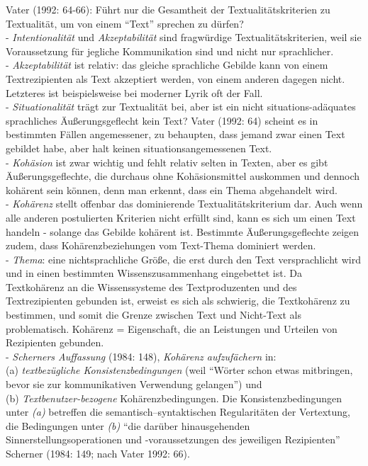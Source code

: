 \documentclass[
  letterpaper,
]{scrbook}
\begin{document}
Vater (1992: 64-66): Führt nur die Gesamtheit der Textualitätskriterien
zu Textualität, um von einem ``Text'' sprechen zu dürfen?\\
- \emph{Intentionalität} und \emph{Akzeptabilität} sind fragwürdige
Textualitätskriterien, weil sie Voraussetzung für jegliche Kommunikation
sind und nicht nur sprachlicher.\\
- \emph{Akzeptabilität} ist relativ: das gleiche sprachliche Gebilde
kann von einem Textrezipienten als Text akzeptiert werden, von einem
anderen dagegen nicht. Letzteres ist beispielsweise bei moderner Lyrik
oft der Fall.\\
- \emph{Situationalität} trägt zur Textualität bei, aber ist ein nicht
situations-adäquates sprachliches Äußerungsgeflecht kein Text? Vater
(1992: 64) scheint es in bestimmten Fällen angemessener, zu behaupten,
dass jemand zwar einen Text gebildet habe, aber halt keinen
situationsangemessenen Text.\\
- \emph{Kohäsion} ist zwar wichtig und fehlt relativ selten in Texten,
aber es gibt Äußerungsgeflechte, die durchaus ohne Kohäsionsmittel
auskommen und dennoch kohärent sein können, denn man erkennt, dass ein
Thema abgehandelt wird.\\
- \emph{Kohärenz} stellt offenbar das dominierende Textualitätskriterium
dar. Auch wenn alle anderen postulierten Kriterien nicht erfüllt sind,
kann es sich um einen Text handeln - solange das Gebilde kohärent ist.
Bestimmte Äußerungsgeflechte zeigen zudem, dass Kohärenzbeziehungen vom
Text-Thema dominiert werden.\\
- \emph{Thema}: eine nichtsprachliche Größe, die erst durch den Text
versprachlicht wird und in einen bestimmten Wissenszusammenhang
eingebettet ist. Da Textkohärenz an die Wissenssysteme des
Textproduzenten und des Textrezipienten gebunden ist, erweist es sich
als schwierig, die Textkohärenz zu bestimmen, und somit die Grenze
zwischen Text und Nicht-Text als problematisch. Kohärenz = Eigenschaft,
die an Leistungen und Urteilen von Rezipienten gebunden.\\
- \emph{Scherners Auffassung} (1984: 148), \emph{Kohärenz aufzufächern}
in:\\
(a) \emph{textbezügliche Konsistenzbedingungen} (weil ``Wörter schon
etwas mitbringen, bevor sie zur kommunikativen Verwendung gelangen'')
und\\
(b) \emph{Textbenutzer-bezogene} Kohärenzbedingungen. Die
Konsistenzbedingungen unter \emph{(a)} betreffen die
semantisch--syntaktischen Regularitäten der Vertextung, die Bedingungen
unter \emph{(b)} ``die darüber hinausgehenden Sinnerstellungsoperationen
und -voraussetzungen des jeweiligen Rezipienten'' Scherner (1984: 149;
nach Vater 1992: 66).
\end{document}

